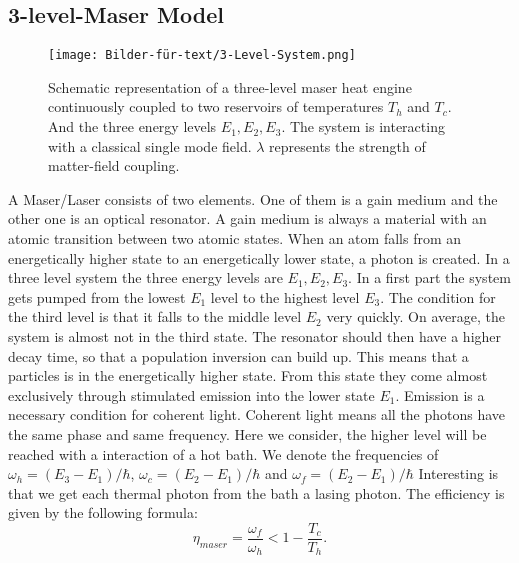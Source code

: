 \documentclass[12pt,a4paper]{article}
\begin{document}
\subsection{3-level-Maser Model}
\begin{figure}[h!] 
\texttt{[image: Bilder-für-text/3-Level-System.png]}
\caption{Schematic representation of a three-level maser heat engine
continuously coupled to two reservoirs of temperatures $T_h$ and
$T_c$. And the three energy levels $E_1,E_2,E_3$. The
system is interacting with a classical single mode field. $\lambda$
represents the strength of matter-field coupling.}
\end{figure}
A Maser/Laser consists of two elements. One of them is a gain medium and the other one is an optical resonator. A gain medium is always a material with an atomic transition between two atomic states. When an atom falls from an energetically higher state to an energetically lower state, a photon is created.
In a three level system the three energy levels are $E_1,E_2,E_3$. In a first part the system gets pumped from the lowest $E_1$ level to the highest level $ E_3$. The condition for the third level is that it falls to the middle level $ E_2$ very quickly. On average, the system is almost not in the third state. The resonator should then have a higher decay time, so that a population inversion can build up. This means that a particles is in the energetically higher state. From this state they come almost exclusively through stimulated emission into the lower state $ E_1$. 
Emission is a necessary condition for coherent light. Coherent light means all the photons have the same phase and same frequency. \cite{Li2017}
Here we consider, the higher level will be reached with a interaction of a hot bath.  
We denote the frequencies of $\omega_h=(E_3-E_1)/\hbar$, $\omega_c=(E_2-E_1)/\hbar$ and $\omega_f=(E_2-E_1)/\hbar$
Interesting is that we get each thermal photon from the bath a lasing photon. 
The efficiency is given by the following formula:
\begin{equation}
\eta_{maser}=\frac{\omega_f}{\omega_h}<1-\frac{T_c}{T_h}.
\end{equation}
\end{document}
